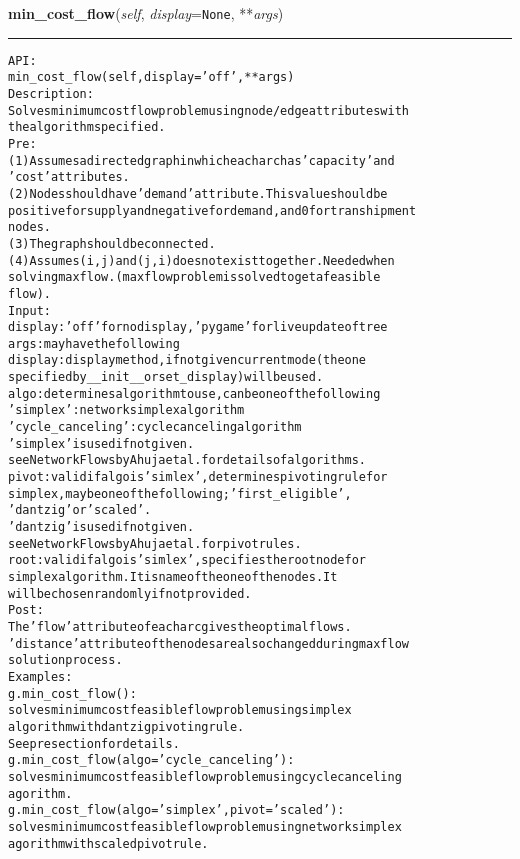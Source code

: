     \label{coinor:gimpy:graph:Graph:min_cost_flow}

    \vspace{0.5ex}

\hspace{.8\funcindent}\begin{boxedminipage}{\funcwidth}

    \raggedright \textbf{min\_cost\_flow}(\textit{self}, \textit{display}={\tt None}, **\textit{args})

    \vspace{-1.5ex}

    \rule{\textwidth}{0.5\fboxrule}
\setlength{\parskip}{2ex}
\begin{alltt}

API:
    min\_cost\_flow(self, display='off', **args)
Description:
    Solves minimum cost flow problem using node/edge attributes with
    the algorithm specified.
Pre:
    (1) Assumes a directed graph in which each arc has 'capacity' and
    'cost' attributes.
    (2) Nodes should have 'demand' attribute. This value should be
    positive for supply and negative for demand, and 0 for transhipment
    nodes.
    (3) The graph should be connected.
    (4) Assumes (i,j) and (j,i) does not exist together. Needed when
    solving max flow. (max flow problem is solved to get a feasible
    flow).
Input:
    display: 'off' for no display, 'pygame' for live update of tree
    args: may have the following
        display: display method, if not given current mode (the one
            specified by \_\_init\_\_ or set\_display) will be used.
        algo: determines algorithm to use, can be one of the following
            'simplex': network simplex algorithm
            'cycle\_canceling': cycle canceling algorithm
            'simplex' is used if not given.
            see Network Flows by Ahuja et al. for details of algorithms.
        pivot: valid if algo is 'simlex', determines pivoting rule for
            simplex, may be one of the following; 'first\_eligible',
            'dantzig' or 'scaled'.
            'dantzig' is used if not given.
            see Network Flows by Ahuja et al. for pivot rules.
        root: valid if algo is 'simlex', specifies the root node for
            simplex algorithm. It is name of the one of the nodes. It
            will be chosen randomly if not provided.
Post:
    The 'flow' attribute of each arc gives the optimal flows.
    'distance' attribute of the nodes are also changed during max flow
    solution process.
Examples:
    g.min\_cost\_flow():
        solves minimum cost feasible flow problem using simplex
        algorithm with dantzig pivoting rule.
        See pre section for details.
    g.min\_cost\_flow(algo='cycle\_canceling'):
        solves minimum cost feasible flow problem using cycle canceling
        agorithm.
    g.min\_cost\_flow(algo='simplex', pivot='scaled'):
        solves minimum cost feasible flow problem using network simplex
        agorithm with scaled pivot rule.
\end{alltt}


\end{boxedminipage}
